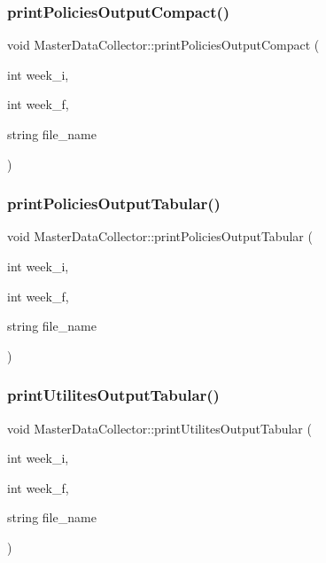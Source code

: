 \subsubsection{\texorpdfstring{print\+Policies\+Output\+Compact()}{printPoliciesOutputCompact()}}
{\footnotesize\ttfamily void Master\+Data\+Collector\+::print\+Policies\+Output\+Compact (\begin{DoxyParamCaption}\item[{int}]{week\+\_\+i,  }\item[{int}]{week\+\_\+f,  }\item[{string}]{file\+\_\+name }\end{DoxyParamCaption})}

\mbox{\label{classMasterDataCollector_aa4a08525c6757376edba653a17d6ff60_aa4a08525c6757376edba653a17d6ff60}} 
\subsubsection{\texorpdfstring{print\+Policies\+Output\+Tabular()}{printPoliciesOutputTabular()}}
{\footnotesize\ttfamily void Master\+Data\+Collector\+::print\+Policies\+Output\+Tabular (\begin{DoxyParamCaption}\item[{int}]{week\+\_\+i,  }\item[{int}]{week\+\_\+f,  }\item[{string}]{file\+\_\+name }\end{DoxyParamCaption})}

\mbox{\label{classMasterDataCollector_a772bc65951a1170900e89679cc7e0652_a772bc65951a1170900e89679cc7e0652}} 
\subsubsection{\texorpdfstring{print\+Utilites\+Output\+Tabular()}{printUtilitesOutputTabular()}}
{\footnotesize\ttfamily void Master\+Data\+Collector\+::print\+Utilites\+Output\+Tabular (\begin{DoxyParamCaption}\item[{int}]{week\+\_\+i,  }\item[{int}]{week\+\_\+f,  }\item[{string}]{file\+\_\+name }\end{DoxyParamCaption})}

